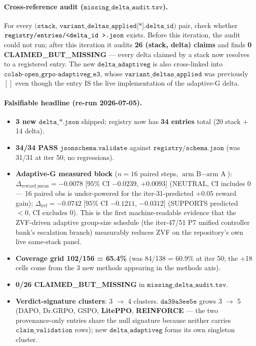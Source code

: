 \paragraph{Cross-reference audit ($\texttt{missing\_delta\_audit.tsv}$).}
For every $\texttt{(stack, variant\_deltas\_applied[*].delta\_id)}$
pair, check whether $\texttt{registry/entries/\textless delta\_id \textgreater.json}$
exists. Before this iteration, the audit could not run; after this iteration it
audits \textbf{26 (stack, delta) claims} and finds \textbf{0
CLAIMED\_BUT\_MISSING} --- every delta claimed by a stack now
resolves to a registered entry. The new
$\texttt{delta\_adaptiveg}$ is also cross-linked into
$\texttt{colab-open\_grpo-adaptiveg\_e3}$, whose
$\texttt{variant\_deltas\_applied}$ was previously $[]$ even though
the entry IS the live implementation of the adaptive-G delta.

\paragraph{Falsifiable headline (re-run 2026-07-05).}
\begin{itemize}
\item \textbf{3 new $\texttt{delta\_*.json}$} shipped; registry
now has \textbf{34 entries} total (20 stack + 14 delta).
\item \textbf{34/34 PASS} $\texttt{jsonschema.validate}$ against
$\texttt{registry/schema.json}$ (was 31/31 at iter 50; no
regressions).
\item \textbf{Adaptive-G measured block} ($n=16$ paired steps,
$\text{arm B} - \text{arm A}$):
$\Delta_{\text{reward\_mean}} = -0.0078$ [$95\%$ CI $-0.0239$,
$+0.0093$] (NEUTRAL, CI includes 0 --- 16 paired obs is
under-powered for the iter-31-predicted $+0.05$ reward gain);
$\Delta_{\text{zvf}} = \mathbf{-0.0742}$ [$95\%$ CI $-0.1211$,
$-0.0312$] (SUPPORTS predicted $<0$, CI excludes 0). This is the
first machine-readable evidence that the ZVF-driven adaptive
group-size schedule (the iter-47/51 P7 unified controller bank's
escalation branch) measurably reduces ZVF on the repository's own
live same-stack panel.
\item \textbf{Coverage grid 102/156 = 65.4\%} (was 84/138 = 60.9\%
at iter 50; the +18 cells come from the 3 new methods appearing in
the methods axis).
\item \textbf{0/26 CLAIMED\_BUT\_MISSING} in
$\texttt{missing\_delta\_audit.tsv}$.
\item \textbf{Verdict-signature clusters}: 3 $\to$ 4 clusters.
$\texttt{da39a3ee5e}$ grows 3 $\to$ 5 (DAPO, Dr.GRPO, GSPO,
\textbf{LitePPO}, \textbf{REINFORCE} --- the two provenance-only
entries share the null signature because neither carries
$\texttt{claim\_validation}$ rows); new
$\texttt{delta\_adaptiveg}$ forms its own singleton cluster.
\end{itemize}

